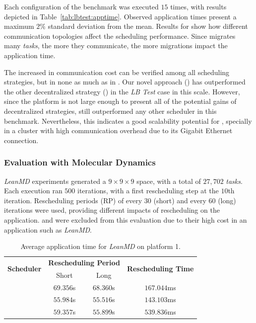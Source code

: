Each configuration of the benchmark was executed $15$ times, with results depicted in Table~\ref{tab:lbtest:apptime}.
Observed application times present a maximum $2\%$ standard deviation from the mean. 
Results for \greedylb show how different communication topologies affect the scheduling performance.
Since \greedylb migrates many \textit{tasks}, the more they communicate, the more migrations impact the application time.

The increased in communication cost can be verified among all scheduling strategies, but in none as much as in \greedylb.
Our novel approach (\packdrop) has outperformed the other decentralized strategy (\distributedlb) in the \textit{LB Test} case in this scale.
However, since the platform is not large enough to present all of the potential gains of decentralized strategies,  still outperformed any other scheduler in this benchmark.
Nevertheless, this indicates a good scalability potential for \packdrop, specially in a cluster with high communication overhead due to its Gigabit Ethernet connection. %

\subsubsection{Evaluation with Molecular Dynamics} \label{sec:cluster:md}

\textit{LeanMD} experiments generated a $9\times9\times9$ space, with a total of $27,702$ \textit{tasks}.
Each execution ran $500$ iterations, with a first rescheduling step at the $10$th iteration. 
Rescheduling periods (RP) of every $30$ (short) and every $60$ (long) iterations were used, providing different impacts of rescheduling on the application.
\greedylb and \dummylb were excluded from this evaluation due to their high cost in an application such as \textit{LeanMD}. 

\begin{table}[!ht]
	\centering
	\caption{Average application time for \textit{LeanMD} on platform 1.}	
	\begin{tabular}{l c c c}
	\toprule
	\multirow{2}{*}{\textbf{Scheduler}} 	& \multicolumn{2}{c}{\textbf{Rescheduling Period}} & \multirow{2}{*}{\textbf{Rescheduling Time}} \\ \cmidrule{2-3}
 								& Short & Long \\	
	\midrule
	
	\distributedlb & $69.356$s & $68.360$s & $167.044$ms \\ 
	\packdrop & $55.984$s & $55.516$s & $143.103$ms \\ 
	 & $59.357$s & $55.899$s & $539.836$ms \\ 
	\bottomrule	
	\end{tabular}
	\label{tab:eval:g5k:leanmd:time} 
\end{table}

